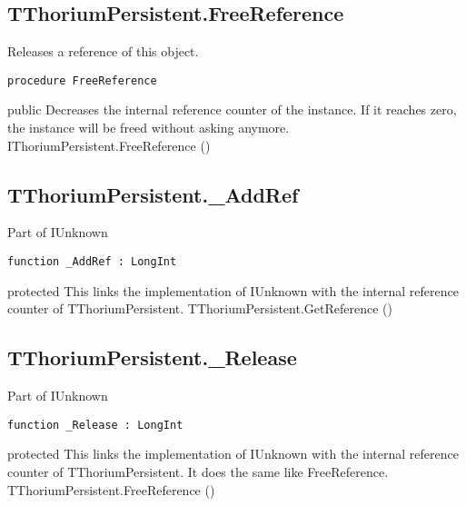 \subsection{TThoriumPersistent.FreeReference}
\label{thoriumcore:thorium:tthoriumpersistent:freereference}
\begin{FPCList}
\Synopsis
Releases a reference of this object.\Declaration 

\begin{verbatim}
procedure FreeReference
\end{verbatim}
\Visibility
public
\Description
Decreases the internal reference counter of the instance. If it reaches zero, the instance will be freed without asking anymore. \Errors
\SeeAlso
IThoriumPersistent.FreeReference (\pageref{thoriumcore:thorium:ithoriumpersistent:freereference})\end{FPCList}
\subsection{TThoriumPersistent.\_AddRef}
\label{thoriumcore:thorium:tthoriumpersistent:addref}
\begin{FPCList}
\Synopsis
Part of IUnknown\Declaration 

\begin{verbatim}
function _AddRef : LongInt
\end{verbatim}
\Visibility
protected
\Description
This links the implementation of IUnknown with the internal reference counter of TThoriumPersistent. \Errors
\SeeAlso
TThoriumPersistent.GetReference (\pageref{thoriumcore:thorium:tthoriumpersistent:getreference})\end{FPCList}
\subsection{TThoriumPersistent.\_Release}
\label{thoriumcore:thorium:tthoriumpersistent:release}
\begin{FPCList}
\Synopsis
Part of IUnknown\Declaration 

\begin{verbatim}
function _Release : LongInt
\end{verbatim}
\Visibility
protected
\Description
This links the implementation of IUnknown with the internal reference counter of TThoriumPersistent. It does the same like FreeReference. \Errors
\SeeAlso
TThoriumPersistent.FreeReference (\pageref{thoriumcore:thorium:tthoriumpersistent:freereference})\end{FPCList}
